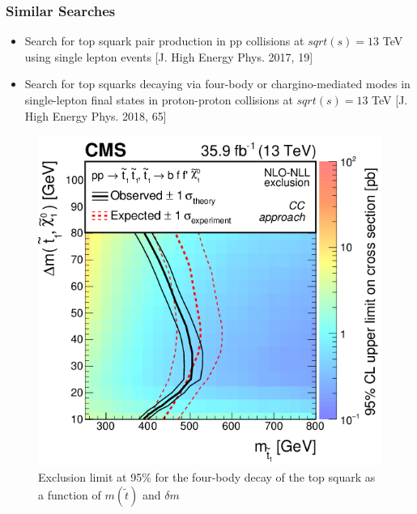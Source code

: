\documentclass{beamer}
\begin{document}
\begin{frame}
\frametitle{Similar Searches}
{\footnotesize
\begin{itemize}
\item Search for top squark pair production in pp collisions at $sqrt(s) = 13$ TeV using single lepton events [J. High Energy Phys. 2017, 19]
\item Search for top squarks decaying via four-body or chargino-mediated modes in single-lepton final states in proton-proton collisions at $sqrt(s) = 13$ TeV [J. High Energy Phys. 2018, 65]

\end{itemize}
}
\begin{figure}
\centering
\includegraphics[scale=0.2]{pictures/Figure_007-a} 
\caption{{\scriptsize     Exclusion limit at 95\% for the four-body decay of the top squark as a function of $m(\tilde{t})$ and $\delta m$ } }
\label{04402}
\end{figure}

\end{frame}



\end{document}
